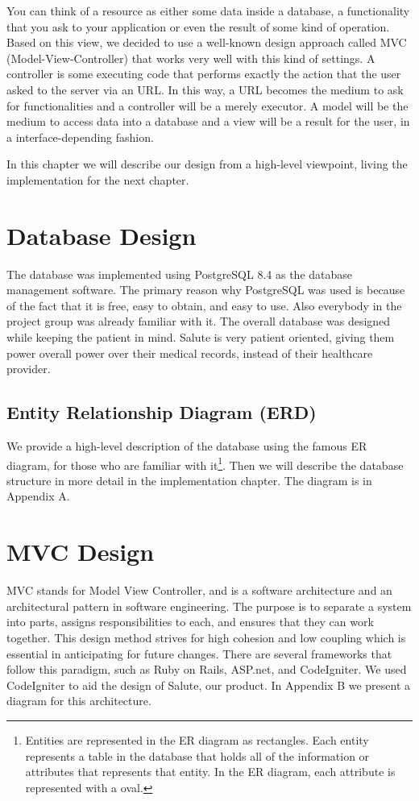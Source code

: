 \documentclass[12pt]{report}
\begin{document}
You can think of a resource as either some data inside a database, a functionality that you ask to your application or even the result of some kind of operation. Based on this view, we decided to use a well-known design approach called MVC (Model-View-Controller) that works very well with this kind of settings. A controller is some executing code that performs exactly the action that the user asked to the server via an URL. In this way, a URL becomes the medium to ask for functionalities and a controller will be a merely executor. A model will be the medium to access data into a database and a view will be a result for the user, in a interface-depending fashion.

In this chapter we will describe our design from a high-level viewpoint, living the implementation for the next chapter.

\section{Database Design}
The database was implemented using PostgreSQL 8.4 as the database management software.  The primary reason why PostgreSQL was used is because of the fact that it is free, easy to obtain, and easy to use. Also everybody in the project group was already familiar with it.
The overall database was designed while keeping the patient in mind.  Salute is very patient oriented, giving them power overall  power over their medical records, instead of their healthcare provider.

\subsection{Entity Relationship Diagram (ERD)}
We provide a high-level description of the database using the famous ER diagram, for those who are familiar with it\footnote{Entities are represented in the ER diagram as rectangles.  Each entity represents a table in the database that holds all of the information or attributes that represents that entity.  In the ER diagram, each attribute is represented with a oval.}. Then we will describe the database structure in more detail in the implementation chapter. The diagram is in Appendix A.


\section{MVC Design}

MVC stands for Model View Controller, and is a software architecture and an architectural pattern in software engineering. The purpose is to separate a system into parts, assigns responsibilities to each, and ensures that they can work together. This design method strives for high cohesion and low coupling which is essential in anticipating for future changes. There are several frameworks that follow this paradigm, such as Ruby on Rails, ASP.net, and CodeIgniter. We used CodeIgniter to aid the design of Salute, our product.  In Appendix B we present a diagram for this architecture.
\end{document}
